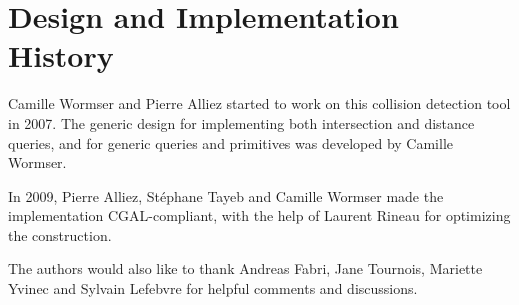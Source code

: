 \section{Design and Implementation History}
\label{AABB_tree_section_history}

Camille Wormser and Pierre Alliez started to work on this collision detection tool in 2007. The generic design for implementing both intersection and distance queries, and for generic queries and primitives was developed by Camille Wormser.

In 2009, Pierre Alliez, St\'ephane Tayeb and Camille Wormser made the implementation CGAL-compliant, with the help of Laurent Rineau for optimizing the construction.

The authors would also like to thank Andreas Fabri, Jane Tournois, Mariette Yvinec and Sylvain Lefebvre for helpful comments and discussions.
